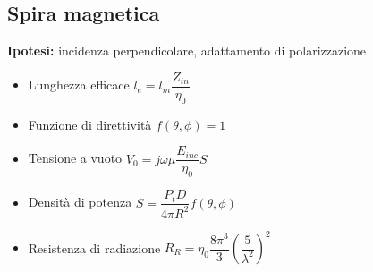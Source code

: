\documentclass{article}
\begin{document}
\subsection{Spira magnetica}
\textbf{Ipotesi:} incidenza perpendicolare, adattamento di polarizzazione
\begin{itemize}
	\item Lunghezza efficace \(l_e = l_m \dfrac{Z_{in}}{\eta_0}\)
	\item Funzione di direttività \(f(\theta, \phi) = 1 \)
	\item Tensione a vuoto \( V_0 = j \omega \mu \dfrac{E_{inc}}{\eta_0} S \) 
	\item Densità di potenza \( S = \dfrac{P_t D}{4 \pi R^2} f(\theta, \phi) \)
	\item Resistenza di radiazione \( R_R = \eta_0 \dfrac{8 \pi^3}{3}\left( \dfrac{5}{\lambda^2} \right) ^ 2 \)
	
\end{itemize}
\end{document}

